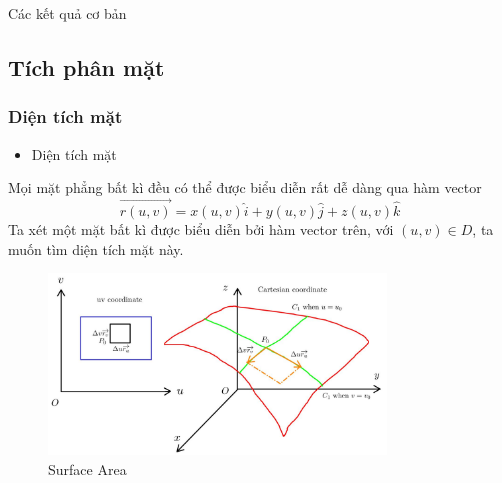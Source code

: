 \documentclass[8pt]{beamer}
\begin{document}
\begin{frame}{Các kết quả cơ bản}
\subsection{Tích phân mặt}
\subsubsection{Diện tích mặt}

\begin{itemize}
	\item Diện tích mặt
\end{itemize}
Mọi mặt phẳng bất kì đều có thể được biểu diễn rất dễ dàng qua hàm vector $$\overrightarrow{r(u,v)}=x(u,v)\hat i+y(u,v)\hat j+z(u,v)\hat k$$
Ta xét một mặt bất kì được biểu diễn bởi hàm vector trên, với $(u,v)\in D$, ta muốn tìm diện tích mặt này.
\begin{figure}[h]
			\includegraphics[width=0.8\textwidth]{cartesina.jpg}
			\caption{Surface Area}			\label{fig:re4}
\end{figure}
\end{frame}
\end{document}
